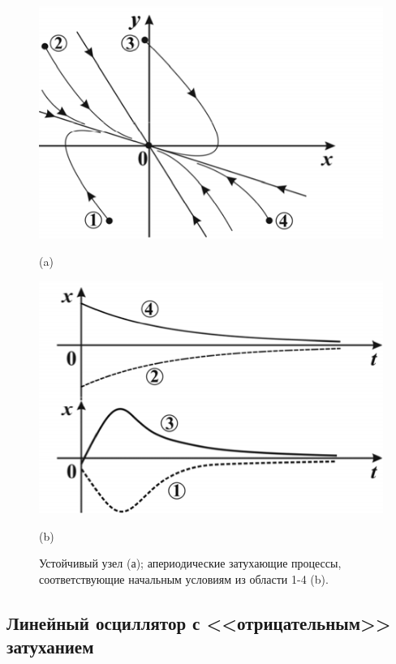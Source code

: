 \begin{figure}[h]
        \centering
        \begin{minipage}{0.45\linewidth}
                \centering  
                \includegraphics[]{fig/lect5/5a}

                (a)
        \end{minipage}
        \begin{minipage}{0.45\linewidth}
                \centering  
                \includegraphics[]{fig/lect5/5b}

                (b)      
        \end{minipage}
        \caption{Устойчивый узел (а); апериодические затухающие процессы, соответствующие начальным условиям из области 1-4 (b).}
        \label{fig:5.5}
\end{figure}

\subsection{Линейный осциллятор с <<отрицательным>> затуханием}%
\label{sub:5.1.3}

